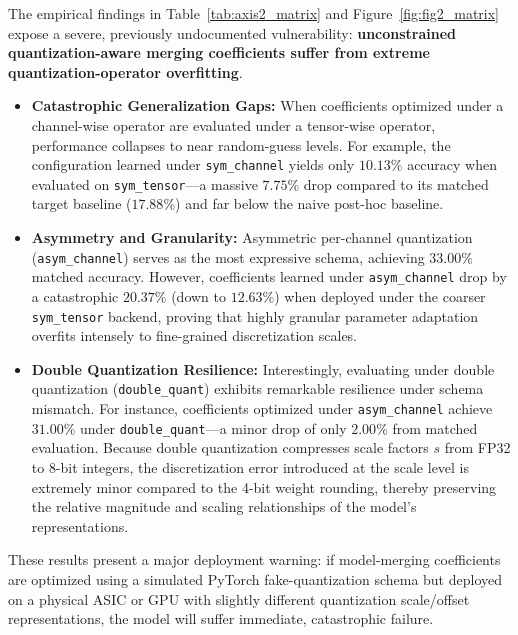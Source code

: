 The empirical findings in Table~\ref{tab:axis2_matrix} and Figure~\ref{fig:fig2_matrix} expose a severe, previously undocumented vulnerability: \textbf{unconstrained quantization-aware merging coefficients suffer from extreme quantization-operator overfitting}.
\begin{itemize}
    \item \textbf{Catastrophic Generalization Gaps:} When coefficients optimized under a channel-wise operator are evaluated under a tensor-wise operator, performance collapses to near random-guess levels. For example, the configuration learned under \texttt{sym\_channel} yields only $10.13\%$ accuracy when evaluated on \texttt{sym\_tensor}---a massive $7.75\%$ drop compared to its matched target baseline ($17.88\%$) and far below the naive post-hoc baseline.
    \item \textbf{Asymmetry and Granularity:} Asymmetric per-channel quantization (\texttt{asym\_channel}) serves as the most expressive schema, achieving $33.00\%$ matched accuracy. However, coefficients learned under \texttt{asym\_channel} drop by a catastrophic $20.37\%$ (down to $12.63\%$) when deployed under the coarser \texttt{sym\_tensor} backend, proving that highly granular parameter adaptation overfits intensely to fine-grained discretization scales.
    \item \textbf{Double Quantization Resilience:} Interestingly, evaluating under double quantization (\texttt{double\_quant}) exhibits remarkable resilience under schema mismatch. For instance, coefficients optimized under \texttt{asym\_channel} achieve $31.00\%$ under \texttt{double\_quant}---a minor drop of only $2.00\%$ from matched evaluation. Because double quantization compresses scale factors $s$ from FP32 to 8-bit integers, the discretization error introduced at the scale level is extremely minor compared to the 4-bit weight rounding, thereby preserving the relative magnitude and scaling relationships of the model's representations.
\end{itemize}
These results present a major deployment warning: if model-merging coefficients are optimized using a simulated PyTorch fake-quantization schema but deployed on a physical ASIC or GPU with slightly different quantization scale/offset representations, the model will suffer immediate, catastrophic failure.

